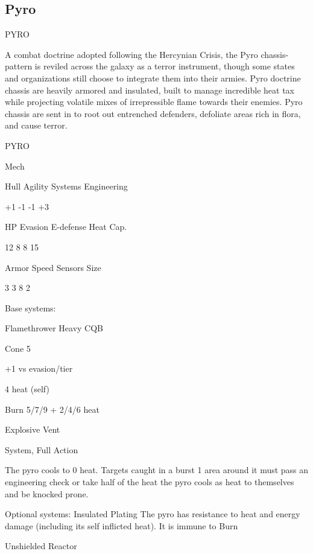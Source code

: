 \subsection{Pyro}

                                                   PYRO  

A combat doctrine adopted following the Hercynian Crisis, the Pyro chassis-pattern is reviled  
across the galaxy as a terror instrument, though some states and organizations still choose to  
integrate them into their armies. Pyro doctrine chassis are heavily armored and insulated, built to  
manage incredible heat tax while projecting volatile mixes of irrepressible flame towards their  
enemies. Pyro chassis are sent in to root out entrenched defenders, defoliate areas rich in flora,  
and cause terror. 
 

 PYRO 

 Mech 

 Hull       Agility      Systems       Engineering 

 +1         -1           -1            +3 

 HP         Evasion      E-defense     Heat Cap. 

 12         8            8             15 

 Armor      Speed        Sensors       Size 

 3          3            8             2 

Base systems:
 
Flamethrower  
Heavy CQB
 
Cone 5
 
+1 vs evasion/tier
 
4 heat (self)
 
Burn 5/7/9 + 2/4/6 heat
 

Explosive Vent
 
System, Full Action
 
The pyro cools to 0 heat. Targets caught in a burst 1 area around it must pass an engineering  
check or take half of the heat the pyro cools as heat to themselves and be knocked prone.
 

Optional systems:  
Insulated Plating  
The pyro has resistance to heat and energy damage (including its self inflicted heat). It is immune  
to Burn
 

Unshielded Reactor  

                                                                                                           


